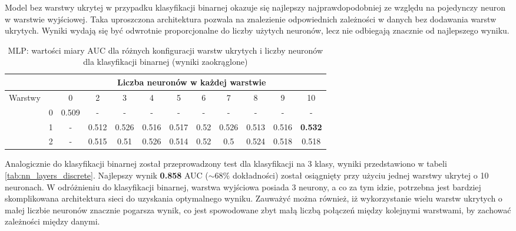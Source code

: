 \documentclass[a4paper, twoside, 11pt, openright]{article}
\begin{document}
Model bez warstwy ukrytej w przypadku klasyfikacji binarnej okazuje się najlepszy najprawdopodobniej ze względu na pojedynczy neuron w warstwie wyjściowej. Taka uproszczona architektura pozwala na znalezienie odpowiednich zależności w danych bez dodawania warstw ukrytych. Wyniki wydają się być odwrotnie proporcjonalne do liczby użytych neuronów, lecz nie odbiegają znacznie od najlepszego wyniku.

\begin{table}[H]
    \centering
    \begin{tabular}{|c|c|c|c|c|c|c|c|c|c|c|c|}
        \hline
         & &  \multicolumn{10}{c|}{Liczba neuronów w każdej warstwie}  \\ \hline
        \multirow{4}{*}{Warstwy} & & 0 & 2 & 3 & 4 & 5 & 6 & 7 & 8 & 9 & 10  \\ \cline{2 - 12}
			& 0 & 0.509 & - & - & - & - & - & - & - & - & - \\ \cline{2 - 12} 
			& 1 & - &  0.512 &  0.526 &  0.516 &  0.517 &  0.52 &  0.526 &  0.513 &  0.516  & \textbf{0.532} \\ \cline{2 - 12} 
			& 2 & - & 0.515 &    0.51 &   0.526 &   0.514 &    0.52 &     0.5 &   0.524 &   0.518 & 0.518 \\ \cline{2 - 12} \hline

    \end{tabular}
    \caption{MLP: wartości miary AUC dla różnych konfiguracji warstw ukrytych i liczby neuronów dla klasyfikacji binarnej (wyniki zaokrąglone)}
    \label{tab:nn_layers_binary}
\end{table}
Analogicznie do klasyfikacji binarnej został przeprowadzony test dla klasyfikacji na 3 klasy, wyniki przedstawiono w tabeli \ref{tab:nn_layers_discrete}. Najlepszy wynik \textbf{0.858} AUC ($\sim 68\%$ dokładności) został osiągnięty przy użyciu jednej warstwy ukrytej o 10 neuronach. W odróżnieniu do klasyfikacji binarnej, warstwa wyjściowa posiada 3 neurony, a co za tym idzie, potrzebna jest bardziej skomplikowana architektura sieci do uzyskania optymalnego wyniku. Zauważyć można również, iż wykorzystanie wielu warstw ukrytych o małej liczbie neuronów znacznie pogarsza wynik, co jest spowodowane zbyt małą liczbą połączeń między kolejnymi warstwami, by zachować zależności między danymi.
\end{document}
